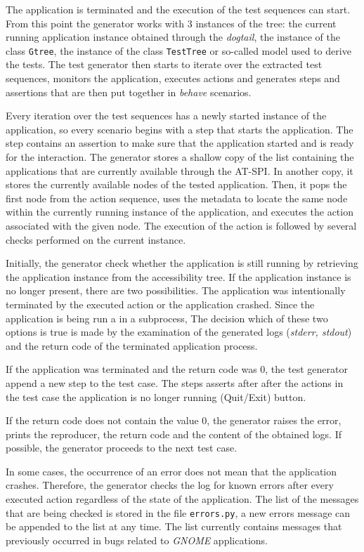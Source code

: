 The application is terminated and the execution of the test sequences can start. From this point the generator works with 3 instances of the tree: the current running application instance obtained through the \textit{dogtail}, the instance of the class \texttt{Gtree}, the instance of the class \texttt{TestTree} or so-called model used to derive the tests.
The test generator then starts to iterate over the extracted test sequences, monitors the application, executes actions and generates steps and assertions that are then put together in \textit{behave} scenarios. 

Every iteration over the test sequences has a newly started instance of the application, so every scenario begins with a step that starts the application. The step contains an assertion to make sure that the application started and is ready for the interaction. The generator stores a shallow copy of the list containing the applications that are currently available through the AT-SPI. In another copy, it stores the currently available nodes of the tested application. Then, it pops the first node from the action sequence, uses the metadata to locate the same node within the currently running instance of the application, and executes the action associated with the given node. The execution of the action is followed by several checks performed on the current instance.

Initially, the generator check whether the application is still running by retrieving the application instance from the accessibility tree. If the application instance is no longer present, there are two possibilities. The application was intentionally terminated by the executed action or the application crashed. Since the application is being run a in a subprocess, The decision which of these two options is true is made by the examination of the generated logs (\textit{stderr, stdout}) and the return code of the terminated application process.

If the application was terminated and the return code was 0, the test generator append a new step to the test case. The steps asserts after after the actions in the test case the application is no longer running (Quit/Exit) button. 

If the return code does not contain the value 0, the generator raises the error, prints the reproducer, the return code and the content of the obtained logs. If possible, the generator proceeds to the next test case. 

In some cases, the occurrence of an error does not mean that the application crashes. Therefore, the generator checks the log for known errors after every executed action regardless of the state of the application. The list of the messages that are being checked is stored in the file \texttt{errors.py}, a new errors message can be appended to the list at any time. The list currently contains messages that previously occurred in bugs related to \textit{GNOME} applications.

